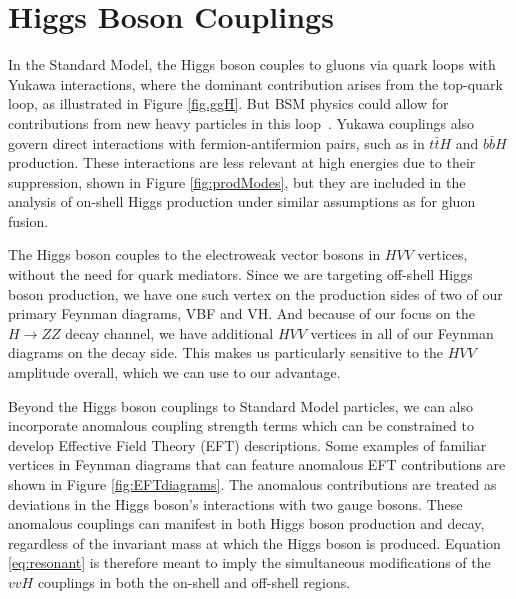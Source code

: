 
\section{Higgs Boson Couplings}

In the Standard Model, the Higgs boson couples to gluons via quark loops with Yukawa interactions, where the dominant contribution arises from the top-quark loop, as illustrated in Figure \ref{fig.ggH}. But BSM physics could allow for contributions from new heavy particles in this loop~\cite{Gonzalez-Alonso:2014eva,Greljo:2015sla}. Yukawa couplings also govern direct interactions with fermion-antifermion pairs, such as in $t\bar{t}H$ and $b\bar{b}H$ production. These interactions are less relevant at high energies due to their suppression, shown in Figure \ref{fig:prodModes}, but they are included in the analysis of on-shell Higgs production under similar assumptions as for gluon fusion.

The Higgs boson couples to the electroweak vector bosons in $HVV$ vertices, without the need for quark mediators. Since we are targeting off-shell Higgs boson production, we have one such vertex on the production sides of two of our primary Feynman diagrams, VBF and VH. And because of our focus on the \( H \to ZZ \) decay channel, we have additional $HVV$ vertices in all of our Feynman diagrams on the decay side. This makes us particularly sensitive to the $HVV$ amplitude overall, which we can use to our advantage.

Beyond the Higgs boson couplings to Standard Model particles, we can also incorporate anomalous coupling strength terms which can be constrained to develop Effective Field Theory (EFT) descriptions. Some examples of familiar vertices in Feynman diagrams that can feature anomalous EFT contributions are shown in Figure \ref{fig:EFTdiagrams}. The anomalous contributions are treated as deviations in the Higgs boson's interactions with two gauge bosons. These anomalous couplings can manifest in both Higgs boson production and decay, regardless of the invariant mass at which the Higgs boson is produced. Equation \ref{eq:resonant} is therefore meant to imply the simultaneous modifications of the $vvH$ couplings in both the on-shell and off-shell regions.


